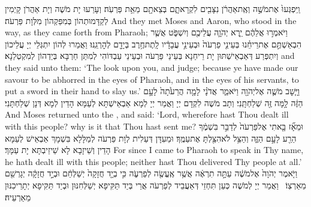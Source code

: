 {וַֽיִּפְגְּעוּ֙ אֶת\maqqaf מֹשֶׁ֣ה וְאֶֽת\maqqaf אַהֲרֹ֔ן נִצָּבִ֖ים לִקְרָאתָ֑ם בְּצֵאתָ֖ם מֵאֵ֥ת פַּרְעֹֽה׃}
{וְעָרַעוּ יָת מֹשֶׁה וְיָת אַהֲרֹן קָיְמִין לְקַדָּמוּתְהוֹן בְּמִפַּקְהוֹן מִלְּוָת פַּרְעֹה׃}
{And they met Moses and Aaron, who stood in the way, as they came forth from Pharaoh;}{}
{וַיֹּאמְר֣וּ אֲלֵהֶ֔ם יֵ֧רֶא יְהֹוָ֛ה עֲלֵיכֶ֖ם וְיִשְׁפֹּ֑ט אֲשֶׁ֧ר הִבְאַשְׁתֶּ֣ם אֶת\maqqaf רֵיחֵ֗נוּ בְּעֵינֵ֤י פַרְעֹה֙ וּבְעֵינֵ֣י עֲבָדָ֔יו לָֽתֶת\maqqaf חֶ֥רֶב בְּיָדָ֖ם לְהׇרְגֵֽנוּ׃}
{וַאֲמַרוּ לְהוֹן יִתְגְּלֵי יְיָ עֲלֵיכוֹן וְיִתְפְּרַע דְּאַבְאֵישְׁתּוּן יָת רֵיחַנָא בְּעֵינֵי פַּרְעֹה וּבְעֵינֵי עַבְדּוֹהִי לְמִתַּן חַרְבָּא בְּיַדְהוֹן לְמִקְטְלַנָא׃}
{and they said unto them: ‘The \lord\space look upon you, and judge; because ye have made our savour to be abhorred in the eyes of Pharaoh, and in the eyes of his servants, to put a sword in their hand to slay us.’}{}
{וַיָּ֧שׇׁב מֹשֶׁ֛ה אֶל\maqqaf יְהֹוָ֖ה וַיֹּאמַ֑ר אֲדֹנָ֗י לָמָ֤ה הֲרֵעֹ֙תָה֙ לָעָ֣ם הַזֶּ֔ה לָ֥מָּה זֶּ֖ה שְׁלַחְתָּֽנִי׃}
{וְתָב מֹשֶׁה לִקְדָם יְיָ וַאֲמַר יְיָ לְמָא אַבְאֵישְׁתָּא לְעַמָּא הָדֵין לְמָא דְּנָן שְׁלַחְתָּנִי׃}
{And Moses returned unto the \lord, and said: ‘Lord, wherefore hast Thou dealt ill with this people? why is it that Thou hast sent me?}{}
{וּמֵאָ֞ז בָּ֤אתִי אֶל\maqqaf פַּרְעֹה֙ לְדַבֵּ֣ר בִּשְׁמֶ֔ךָ הֵרַ֖ע לָעָ֣ם הַזֶּ֑ה וְהַצֵּ֥ל לֹא\maqqaf הִצַּ֖לְתָּ אֶת\maqqaf עַמֶּֽךָ׃}
{וּמֵעִדָּן דְּעַלִית לְוָת פַּרְעֹה לְמַלָּלָא בִּשְׁמָךְ אַבְאֵישׁ לְעַמָּא הָדֵין וְשֵׁיזָבָא לָא שֵׁיזֵיבְתָּא יָת עַמָּךְ׃}
{For since I came to Pharaoh to speak in Thy name, he hath dealt ill with this people; neither hast Thou delivered Thy people at all.’}{}
\newperek
{}%
{וַיֹּ֤אמֶר יְהֹוָה֙ אֶל\maqqaf מֹשֶׁ֔ה עַתָּ֣ה תִרְאֶ֔ה אֲשֶׁ֥ר אֶֽעֱשֶׂ֖ה לְפַרְעֹ֑ה כִּ֣י בְיָ֤ד חֲזָקָה֙ יְשַׁלְּחֵ֔ם וּבְיָ֣ד חֲזָקָ֔ה יְגָרְשֵׁ֖ם מֵאַרְצֽוֹ׃ \setuma }
{וַאֲמַר יְיָ לְמֹשֶׁה כְּעַן תִּחְזֵי דְּאַעֲבֵיד לְפַרְעֹה אֲרֵי בְּיַד תַּקִּיפָא יְשַׁלְּחִנּוּן וּבְיַד תַּקִּיפָא יְתָרֵיכִנּוּן מֵאַרְעֵיהּ׃}
